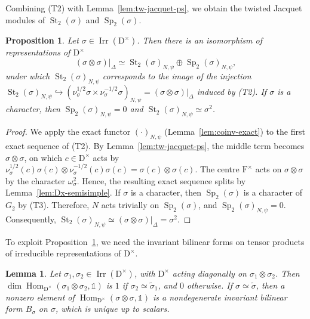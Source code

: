 \documentclass[11pt]{amsart}
\numberwithin{equation}{section}
\theoremstyle{plain}
\newtheorem{proposition}[theorem]{Proposition}
\newtheorem{lemma}[theorem]{Lemma}
\theoremstyle{definition}
\theoremstyle{remark}
\newcommand{\one}{\mathds{1}}
\DeclareMathOperator{\Hom}{Hom}
\DeclareMathOperator{\Irr}{Irr}
\DeclareMathOperator{\St}{St}
\DeclareMathOperator{\Sp}{Sp}
\begin{document}
Combining (T2) with Lemma~\ref{lem:tw-jacquet-ps}, we obtain the twisted Jacquet modules of $\St_2(\sigma)$ and $\Sp_2(\sigma)$.

\begin{proposition}\label{prop:tw-jacquet-St-Sp}
	Let $\sigma\in\Irr(\mathrm{D}^\times)$. Then there is an isomorphism of representations of $\mathrm{D}^\times$
	$$(\sigma\otimes\sigma)|_\Delta\simeq\St_2(\sigma)_{N,\psi}\oplus\Sp_2(\sigma)_{N,\psi},
	$$
	under which $\St_2(\sigma)_{N,\psi}$ corresponds to the image of the injection $\St_2(\sigma)_{N,\psi}\hookrightarrow(\nu_\sigma^{1/2}\sigma\times\nu_\sigma^{-1/2}\sigma)_{N,\psi}=(\sigma\otimes\sigma)|_\Delta$ induced by (T2). If $\sigma$ is a character, then $\Sp_2(\sigma)_{N,\psi}=0$ and $\St_2(\sigma)_{N,\psi}\simeq\sigma^2$.
\end{proposition}

\begin{proof}
	We apply the exact functor $(\cdot)_{N,\psi}$ (Lemma~\ref{lem:coinv-exact}) to the first exact sequence of (T2). By Lemma~\ref{lem:tw-jacquet-ps}, the middle term becomes $\sigma\otimes\sigma$, on which $c\in\mathrm{D}^\times$ acts by $\nu_\sigma^{1/2}(c)\sigma(c)\otimes\nu_\sigma^{-1/2}(c)\sigma(c)=\sigma(c)\otimes\sigma(c)$. The centre $\mathrm{F}^\times$ acts on $\sigma\otimes\sigma$ by the character $\omega_\sigma^2$. Hence, the resulting exact sequence splits by Lemma~\ref{lem:Dx-semisimple}. If $\sigma$ is a character, then $\Sp_2(\sigma)$ is a character of $G_2$ by (T3). Therefore, $N$ acts trivially on $\Sp_2(\sigma)$, and $\Sp_2(\sigma)_{N,\psi}=0$. Consequently, $\St_2(\sigma)_{N,\psi}\simeq(\sigma\otimes\sigma)|_\Delta=\sigma^2$.
\end{proof}

To exploit Proposition~\ref{prop:tw-jacquet-St-Sp}, we need the invariant bilinear forms on tensor products of irreducible representations of $\mathrm{D}^\times$.

\begin{lemma}\label{lem:invariant-forms}
	Let $\sigma_1,\sigma_2\in\Irr(\mathrm{D}^\times)$, with $\mathrm{D}^\times$ acting diagonally on $\sigma_1\otimes\sigma_2$. Then $\dim\Hom_{\mathrm{D}^\times}(\sigma_1\otimes\sigma_2,\one)$ is $1$ if $\sigma_2\simeq\widetilde\sigma_1$, and $0$ otherwise. If $\sigma\simeq\widetilde\sigma$, then a nonzero element of $\Hom_{\mathrm{D}^\times}(\sigma\otimes\sigma,\one)$ is a nondegenerate invariant bilinear form $B_\sigma$ on $\sigma$, which is unique up to scalars.
\end{lemma}
\end{document}

